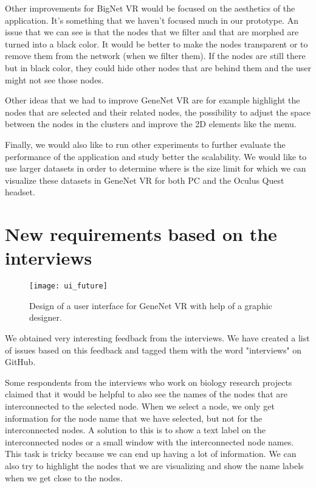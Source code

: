 Other improvements for BigNet VR would be focused on the aesthetics of the application. It's something that we haven't focused much in our prototype. An issue that we can see is that the nodes that we filter and that are morphed are turned into a black color. It would be better to make the nodes transparent or to remove them from the network (when we filter them). If the nodes are still there but in black color, they could hide other nodes that are behind them and the user might not see those nodes.

Other ideas that we had to improve GeneNet VR are for example highlight the nodes that are selected and their related nodes, the possibility to adjust the space between the nodes in the clusters and improve the 2D elements like the menu.

Finally, we would also like to run other experiments to further evaluate the performance of the application and study better the scalability. We would like to use larger datasets in order to determine where is the size limit for which we can visualize these datasets in GeneNet VR for both PC and the Oculus Quest headset.

\section{New requirements based on the interviews}
\begin{figure}[h!]
    \setlength{\tempheight}{15ex}
    \centering
    \texttt{[image: ui\_future]}
    \caption{Design of a user interface for GeneNet VR with help of a graphic designer.}
    \label{fig:issues}
\end{figure}

We obtained very interesting feedback from the interviews. We have created a list of issues based on this feedback and tagged them with the word "interviews" on GitHub.

Some respondents from the interviews who work on biology research projects claimed that it would be helpful to also see the names of the nodes that are interconnected to the selected node. When we select a node, we only get information for the node name that we have selected, but not for the interconnected nodes. A solution to this is to show a text label on the interconnected nodes or a small window with the interconnected node names. This task is tricky because we can end up having a lot of information. We can also try to highlight the nodes that we are visualizing and show the name labels when we get close to the nodes.

